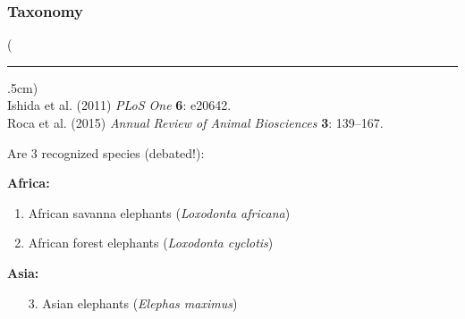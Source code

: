 \documentclass[10pt]{beamer}
\newenvironment{reference}[2]{%
	\begin{textblock*}{\textwidth}(#1,#2)
		\tiny\bgroup\color{gray}}{\egroup\end{textblock*}}
\begin{document}
\begin{frame}[t]
\frametitle{Taxonomy}
\vspace{0.5cm}

	\begin{reference}{4mm}{89mm}
		\rule{1.5cm}{0.25pt}\\
		Ishida et al. (2011) \emph{PLoS One} \textbf{6}: e20642.\\
		Roca et al. (2015) \emph{Annual Review of Animal Biosciences} \textbf{3}: 139--167.
	\end{reference}

	Are 3 recognized species (debated!):\\
	
	\vspace{0.25cm}
	
	\textbf{Africa:}\\
		\begin{enumerate}
			\item African savanna elephants (\emph{Loxodonta africana})
			\item African forest elephants (\emph{Loxodonta cyclotis})
		\end{enumerate}
	
	\vspace{0.25cm}
	
	\textbf{Asia:}\\
		\begin{enumerate}
			\item[3.] Asian elephants (\emph{Elephas maximus})
		\end{enumerate}	
\end{frame}   
\end{document}
